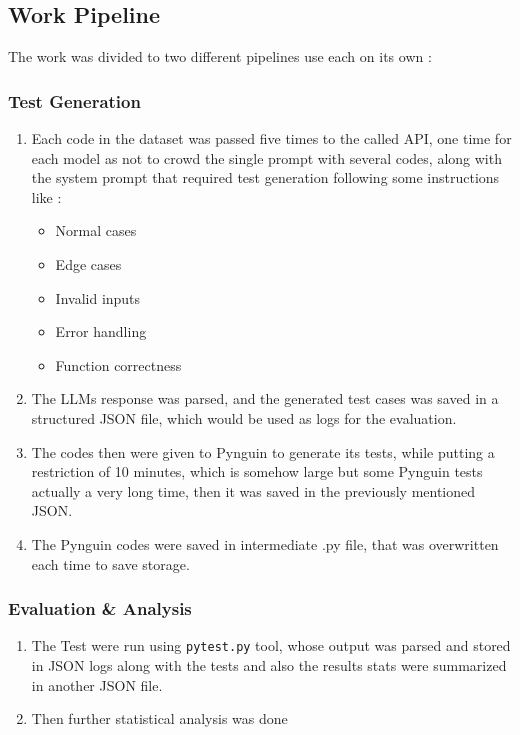 \documentclass[12pt]{article}
\begin{document}
\subsection {Work Pipeline }

The work was divided to two different pipelines use each on its own :

\subsubsection{Test Generation}

\begin{enumerate}
    \item Each code in the dataset was passed five times to the called API, one time for each model as not to crowd the single prompt with several codes, along with the system prompt that required test generation following some instructions like :
    \begin{itemize}
        \item Normal cases
        \item Edge cases
        \item Invalid inputs
        \item Error handling
        \item Function correctness
    \end{itemize}
    \item The LLMs response was parsed, and the generated test cases was saved in a structured JSON file, which would be used as logs for the evaluation.
    \item The codes then were given to Pynguin to generate its tests, while putting a restriction of 10 minutes, which is somehow large but some Pynguin tests actually a very long time, then it was saved in the previously mentioned JSON. 
    \item The Pynguin codes were saved in intermediate .py file, that was overwritten each time to save storage. 
\end{enumerate}
 

\subsubsection{Evaluation \& Analysis}
\begin{enumerate}
    \item The Test were run using \texttt{pytest.py} tool, whose output was parsed and stored in JSON logs along with the tests and also the results stats were summarized in another JSON file.
    \item Then further statistical analysis was done
\end{enumerate}
\end{document}
